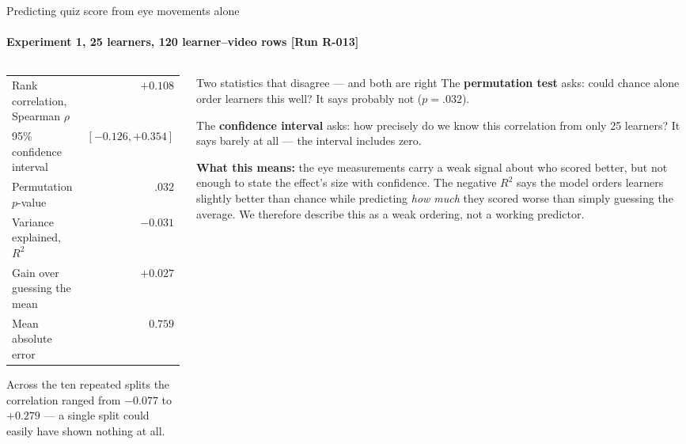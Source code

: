 \documentclass[aspectratio=169,10pt]{beamer}
\makeatletter
\newcommand{\runtag}[1]{{\scriptsize\color{mubeamer@gray7}[#1]}}
\newcommand{\sidenote}[1]{{\scriptsize\color{mubeamer@gray7}\sloppy\par#1\par}}
\makeatother
\begin{document}
\begin{frame}{Predicting quiz score from eye movements alone}
  \framesubtitle{Experiment 1, 25 learners, 120 learner--video rows \runtag{Run R-013}}
  \begin{columns}[T]
    \begin{column}{0.44\textwidth}
      \scriptsize
      \begin{tabular}{@{}lr@{}}
        \toprule
        Rank correlation, Spearman $\rho$ & $+0.108$ \\
        95\% confidence interval & $[-0.126, +0.354]$ \\
        Permutation $p$-value & $.032$ \\
        Variance explained, $R^2$ & $-0.031$ \\
        Gain over guessing the mean & $+0.027$ \\
        Mean absolute error & $0.759$ \\
        \bottomrule
      \end{tabular}

      \vspace{0.5em}
      \sidenote{Across the ten repeated splits the correlation ranged from
      $-0.077$ to $+0.279$ --- a single split could easily have shown nothing
      at all.}
    \end{column}
    \begin{column}{0.52\textwidth}
      \begin{block}{Two statistics that disagree --- and both are right}
        \small
        The \textbf{permutation test} asks: could chance alone order learners
        this well? It says probably not ($p = .032$).

        The \textbf{confidence interval} asks: how precisely do we know this
        correlation from only 25 learners? It says barely at all --- the
        interval includes zero.
      \end{block}
      \sidenote{\textbf{What this means:} the eye measurements carry a weak signal
      about who scored better, but not enough to state the effect's size with
      confidence. The negative $R^2$ says the model orders learners slightly
      better than chance while predicting \emph{how much} they scored worse
      than simply guessing the average. We therefore describe this as a weak
      ordering, not a working predictor.}
    \end{column}
  \end{columns}
\end{frame}
\end{document}
